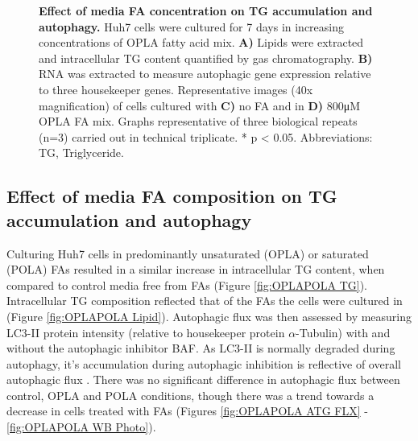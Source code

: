 \begin{figure}[h!]
    \caption{\textbf{Effect of media FA concentration on TG accumulation and autophagy.} Huh7 cells were cultured for 7 days in increasing concentrations of OPLA fatty acid mix. \textbf{A)} Lipids were extracted and intracellular TG content quantified by gas chromatography. \textbf{B)} RNA was extracted to measure autophagic gene expression relative to three housekeeper genes. Representative images (40x magnification) of cells cultured with \textbf{C)} no FA and in \textbf{D)} 800μM OPLA FA mix. Graphs representative of three biological repeats (n=3) carried out in technical triplicate. * p < 0.05. Abbreviations: TG, Triglyceride.}
            \label{fig:ch3-Model Development LFHF}
\end{figure}


\subsection{Effect of media FA composition on TG accumulation and autophagy}

Culturing Huh7 cells in predominantly unsaturated (OPLA) or saturated (POLA) FAs resulted in a similar increase in intracellular TG content, when compared to control media free from FAs (Figure \ref{fig:OPLAPOLA TG}). Intracellular TG composition reflected that of the FAs the cells were cultured in (Figure \ref{fig:OPLAPOLA Lipid}). Autophagic flux was then assessed by measuring LC3-II protein intensity (relative to housekeeper protein $\alpha$-Tubulin) with and without the autophagic inhibitor BAF. As LC3-II is normally degraded during autophagy, it's accumulation during autophagic inhibition is reflective of overall autophagic flux \cite{DJ2021Guidelines1}. There was no significant difference in autophagic flux between control, OPLA and POLA conditions, though there was a trend towards a decrease in cells treated with FAs (Figures \ref{fig:OPLAPOLA ATG FLX} - \ref{fig:OPLAPOLA WB Photo}).

